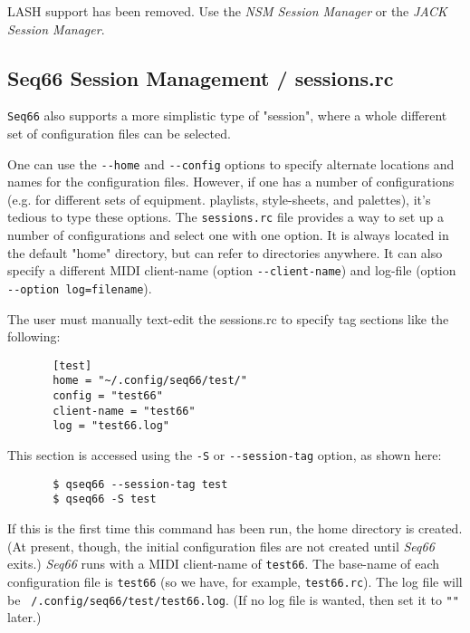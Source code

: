    LASH support has been removed.  Use the \textsl{NSM Session Manager} or
   the \textsl{JACK Session Manager}.

\subsection{Seq66 Session Management / sessions.rc}
\label{subsec:sessions_sessions_rc}

   \texttt{Seq66} also supports a more simplistic type of "session",
   where a whole different set of configuration files can be selected.

   One can use the \texttt{-{}-home} and \texttt{-{}-config} options
   to specify alternate locations and names for the configuration files.
   However, if one has a number of configurations
   (e.g. for different sets of equipment. playlists,
   style-sheets, and palettes),
   it's tedious to type these options.
   The \texttt{sessions.rc} file provides a way to set up a
   number of configurations and select one with one option.
   It is always located in the default
   "home" directory, but can refer to directories anywhere. It can also
   specify a different MIDI client-name
   (option \texttt{-{}-client-name})
   and log-file
   (option \texttt{-{}-option log=filename}).

   The user must manually text-edit the sessions.rc to specify tag
   sections like the following:

   \begin{verbatim}
       [test]
       home = "~/.config/seq66/test/"
       config = "test66"
       client-name = "test66"
       log = "test66.log"
   \end{verbatim}

   This section is accessed using the \texttt{-S} or
   \texttt{-{}-session-tag} option, as shown here:

   \begin{verbatim}
       $ qseq66 --session-tag test
       $ qseq66 -S test
   \end{verbatim}

   If this is the first time this command has been run, the
   home directory is created.
   (At present, though, the initial configuration files are not
   created until \textsl{Seq66} exits.)
   \textsl{Seq66} runs with a MIDI client-name of
   \texttt{test66}.
   The base-name of each configuration file
   is \texttt{test66} (so we have, for example, \texttt{test66.rc}).
   The log file will be
   \texttt{~/.config/seq66/test/test66.log}.
   (If no log file is wanted, then set it to \texttt{""} later.)

